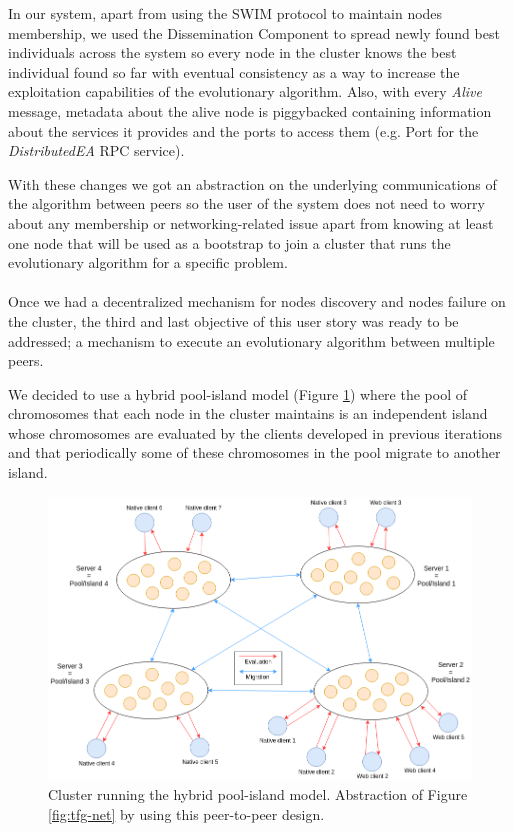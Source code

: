 In our system, apart from using the SWIM protocol to maintain nodes membership, we used the Dissemination Component to spread newly found best individuals across the system so every node in the cluster knows the best individual found so far with eventual consistency as a way to increase the exploitation capabilities of the evolutionary algorithm. Also, with every \textit{Alive} message, metadata about the alive node is piggybacked containing information about the services it provides and the ports to access them (e.g. Port for the \textit{DistributedEA} RPC service).

With these changes we got an abstraction on the underlying communications of the algorithm between peers so the user of the system does not need to worry about any membership or networking-related issue apart from knowing at least one node that will be used as a bootstrap to join a cluster that runs the evolutionary algorithm for a specific problem.


\paragraph*{}
Once we had a decentralized mechanism for nodes discovery and nodes failure on the cluster, the third and last objective of this user story was ready to be addressed; a mechanism to execute an evolutionary algorithm between multiple peers.

We decided to use a hybrid pool-island model (Figure \ref{fig:tfg-net-abstraction}) where the pool of chromosomes that each node in the cluster maintains is an independent island whose chromosomes are evaluated by the clients developed in previous iterations and that periodically some of these chromosomes in the pool migrate to another island.

\begin{figure}[h!]
		\centering
    	\includegraphics[width=\linewidth]{assets/images/tfg-net-abstraction.png}
    	\caption{Cluster running the hybrid pool-island model. Abstraction of Figure \ref{fig:tfg-net} by using this  peer-to-peer design.}
    	\label{fig:tfg-net-abstraction}
\end{figure}

